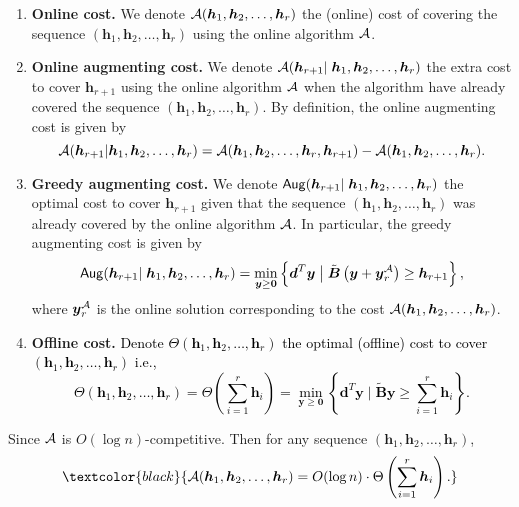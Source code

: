 \documentclass[moor]{informs1}              %
\newcommand{\mb}[1]{\ensuremath{\boldsymbol{#1}}}
\newcommand*{\red}{\textcolor{black}}
\begin{document}
\vspace{2mm}
\begin{enumerate}
\item {\bf Online cost.} We denote ${\cal A} ( \mb h_1, \mb h_2,\ldots, \mb h_r)$ the  (online) cost of covering the sequence $( \mb h_1, \mb h_2,\ldots, \mb h_r)$ using the online algorithm ${\cal A}$.

\vspace{2mm}
\item {\bf Online augmenting cost.} We denote ${\cal A} ( {\mb h}_{r+1}  \vert \; \mb h_1, \mb h_2,\ldots, \mb h_r)$ the extra cost to cover ${\mb h}_{r+1} $ using the online algorithm $\cal A$ when the algorithm have already covered  the sequence $( \mb h_1, \mb h_2,\ldots, \mb h_r)$. By definition, the online augmenting cost is given by
\begin{equation} \label{eq:aug}
{\cal A} ( {\mb h}_{r+1} \vert \mb h_1, \mb h_2,\ldots, \mb h_r) ={\cal A} (  \mb h_1, \mb h_2,\ldots, \mb h_r , {\mb h}_{r+1} )-  {\cal A} (\mb h_1, \mb h_2,\ldots, \mb h_r).
\end{equation}

\vspace{2mm}
\item {\bf Greedy augmenting cost.} We denote ${\sf Aug} ( \mb h_{r+1} \vert \; \mb h_1, \mb h_2,\ldots, \mb h_r)$ the optimal cost to cover $\mb h_{r+1}$  given that the sequence $( \mb h_1, \mb h_2,\ldots, \mb h_r)$ was already covered by the online algorithm $\cal A$. In particular, the greedy augmenting cost is given by
\red{\begin{equation} \label{eq:optaug}
{\sf Aug} ( \mb h_{r+1} \vert \; \mb h_1, \mb h_2,\ldots, \mb h_r) = \min_{ \mb y \geq \mb 0} \left\{ \mb d^T \mb y \; \big\vert \; \tilde{ \mb B } \left( \mb y+ \mb y_r^{\cal A} \right)\geq \mb h_{r+1} \right\},
\end{equation}}
where $\mb y_r^{\cal A}$ is the online solution corresponding to the cost ${\cal A}( \mb h_1, \mb h_2,\ldots, \mb h_r)$.

\vspace{2mm}
\item  {\bf Offline cost.} \red{Denote $\Theta (\mb h_1, \mb h_2,\ldots, \mb h_r)$ the optimal (offline) cost to cover $( \mb h_1, \mb h_2,\ldots, \mb h_r)$ i.e.,
$$ \Theta(\mb h_1, \mb h_2,\ldots, \mb h_r) = \Theta \left( \sum_{ i =1}^r \mb h_i  \right) = \min_{\mb y \geq \mb 0} \left\{ \mb d^T \mb y \; \bigg\vert \; \tilde{ \mb B} \mb y \geq \sum_{ i =1}^r \mb h_i \right\}. $$}
\end{enumerate}
Since $\cal A$ is $O(\log n)$-competitive. Then for any sequence $( \mb h_1, \mb h_2,\ldots, \mb h_r)$,
\begin{equation} \label{thm:noga}
\red{ {\cal A} ( \mb h_1, \mb h_2,\ldots, \mb h_r)=O(\log n) \cdot   \Theta  \left( \sum_{ i =1}^r \mb h_i  \right).}
\end{equation}
\end{document}

